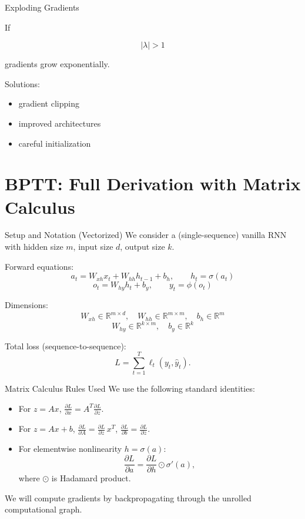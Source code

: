 \documentclass{beamer}
\begin{document}
\begin{frame}{Exploding Gradients}

If

\[
|\lambda| > 1
\]

gradients grow exponentially.

Solutions:

\begin{itemize}
\item gradient clipping
\item improved architectures
\item careful initialization
\end{itemize}
\end{frame}


\section{BPTT: Full Derivation with Matrix Calculus}

\begin{frame}{Setup and Notation (Vectorized)}
  We consider a (single-sequence) vanilla RNN with hidden size \(m\), input size \(d\), output size \(k\).

  Forward equations:
  \[
  a_t = W_{xh} x_t + W_{hh} h_{t-1} + b_h,\qquad h_t = \sigma(a_t)
  \]
  \[
  o_t = W_{hy} h_t + b_y,\qquad y_t = \phi(o_t)
  \]

  Dimensions:
  \[
  W_{xh}\in\mathbb{R}^{m\times d},\quad W_{hh}\in\mathbb{R}^{m\times m},\quad b_h\in\mathbb{R}^m
  \]
  \[
  W_{hy}\in\mathbb{R}^{k\times m},\quad b_y\in\mathbb{R}^k
  \]

  Total loss (sequence-to-sequence):
  \[
  L=\sum_{t=1}^T \ell_t(y_t,\hat y_t).
  \]
\end{frame}

\begin{frame}{Matrix Calculus Rules Used}
  We use the following standard identities:

  \begin{itemize}
  \item For \(z = Ax\), \( \frac{\partial L}{\partial x} = A^T \frac{\partial L}{\partial z}\).
  \item For \(z = Ax + b\), \( \frac{\partial L}{\partial A} = \frac{\partial L}{\partial z}\, x^T\), \(\frac{\partial L}{\partial b} = \frac{\partial L}{\partial z}\).
  \item For elementwise nonlinearity \(h=\sigma(a)\):
    \[
    \frac{\partial L}{\partial a} = \frac{\partial L}{\partial h}\odot \sigma'(a),
    \]
    where \(\odot\) is Hadamard product.
  \end{itemize}

  We will compute gradients by backpropagating through the unrolled computational graph.
\end{frame}
\end{document}
